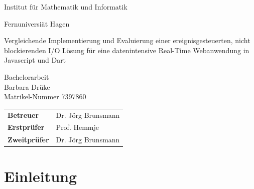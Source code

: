 
\pagestyle{empty}

\clearscrheadings\clearscrplain

\begin{center}
\begin{Huge}
Institut für Mathematik und Informatik\\
\vspace{3mm}
\end{Huge}{\Large Fernuniversiät Hagen}\\

\vspace{20mm}
\begin{Large}
Vergleichende Implementierung und Evaluierung einer ereignisgesteuerten, nicht
blockierenden I/O Lösung für eine datenintensive Real-Time Webanwendung in Javascript
und Dart\\
\end{Large}
\vspace{8mm}
Bachelorarbeit\\
\vspace{0.4cm}
\vspace{2 cm}
Barbara Drüke \\
Matrikel-Nummer 7397860\\
\vspace{5cm}
\begin{tabular}{ll}
{\bf Betreuer} & Dr. Jörg Brunsmann\\
{\bf Erstprüfer}&Prof. Hemmje\\
{\bf Zweitprüfer}&Dr. Jörg Brunsmann\\
\end{tabular}

\end{center}
\clearpage


\pagestyle{useheadings} %

\tableofcontents
\listoffigures
\listoftables
\lstlistoflistings





\chapter{Einleitung}


